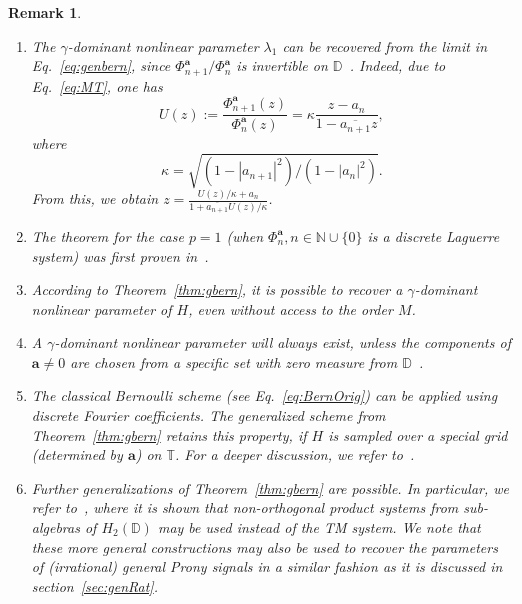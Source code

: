 \documentclass{arxiv}
\newtheorem{remarks}{Remark}[section]
\begin{document}
\begin{remarks} 
\begin{enumerate}[label = \alph*)]
    \item The $\gamma$-dominant nonlinear parameter $\lambda_1$ can be recovered from the limit in Eq.~\eqref{eq:genbern}, since $\Phi_{n+1}^{\boldsymbol{a}} / \Phi_{n}^{\boldsymbol{a}}$ is invertible on $\mathbb{D}$~\cite{siamdozsa}. Indeed, due to Eq.~\eqref{eq:MT}, one has
$$
    U(z) := \frac{\Phi_{n+1}^{\boldsymbol{a}}(z)}{\Phi_{n}^{\boldsymbol{a}}(z)} = \kappa \frac{z - a_{n}}{1 - \overline{a_{n+1}} z},
$$
where
$$
    \kappa = \sqrt{(1 - |a_{n+1}|^2)/(1 - |a_n|^2)}.
$$
From this, we obtain $z = \frac{U(z)/ \kappa + a_n}{1 + \overline{a_{n+1}}U(z) / \kappa}$.

  \item  The theorem for the case $p=1$ (when $\Phi_n^{\boldsymbol{a}}, n \in \mathbb{N} \cup \{0\}$ is a discrete Laguerre system) was first proven in~\cite{SS1}.

    \item According to Theorem~\ref{thm:gbern}, it is possible to recover a $\gamma$-dominant nonlinear parameter of $H$, even without access to the order $M$.

    \item A $\gamma$-dominant nonlinear parameter will always exist, unless the components of $\boldsymbol{a} \neq 0$ are chosen from a specific set with zero measure from $\mathbb{D}$~\cite{SS1, SBS, siamdozsa}.

    \item The classical Bernoulli scheme (see Eq.~\eqref{eq:BernOrig}) can be applied using discrete Fourier coefficients. The generalized scheme from Theorem~\ref{thm:gbern} retains this property, if $H$ is sampled over a special grid (determined by $\boldsymbol{a}$) on $\mathbb{T}$. For a deeper discussion, we refer to~\cite[Sect.~4]{siamdozsa}. 

    \item Further generalizations of Theorem~\ref{thm:gbern} are possible. In particular, we refer to~\cite{med24}, where it is shown that non-orthogonal product systems from sub-algebras of $H_2(\mathbb{D})$ may be used instead of the TM system. We note that these more general constructions may also be used to recover the parameters of (irrational) general Prony signals in a similar fashion as it is discussed in section~\ref{sec:genRat}.
\end{enumerate}
\end{remarks}
\end{document}
